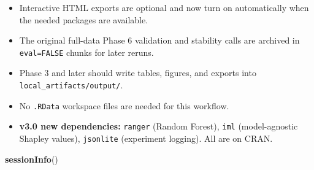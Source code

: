 \documentclass[
]{article}
\newenvironment{Shaded}{\begin{snugshade}}{\end{snugshade}}
\newcommand{\FunctionTok}[1]{\textcolor[rgb]{0.13,0.29,0.53}{\textbf{#1}}}
\newcommand{\NormalTok}[1]{#1}
\begin{document}
\begin{itemize}
  sampled stability checks to stay within 16 GB memory limits.
\item
  Interactive HTML exports are optional and now turn on automatically
  when the needed packages are available.
\item
  The original full-data Phase 6 validation and stability calls are
  archived in \texttt{eval=FALSE} chunks for later reruns.
\item
  Phase 3 and later should write tables, figures, and exports into
  \texttt{local\_artifacts/output/}.
\item
  No \texttt{.RData} workspace files are needed for this workflow.
\item
  \textbf{v3.0 new dependencies:} \texttt{ranger} (Random Forest),
  \texttt{iml} (model-agnostic Shapley values), \texttt{jsonlite}
  (experiment logging). All are on CRAN.
\end{itemize}

\begin{Shaded}
\begin{Highlighting}[]
\FunctionTok{sessionInfo}\NormalTok{()}
\end{Highlighting}
\end{Shaded}
\end{document}
